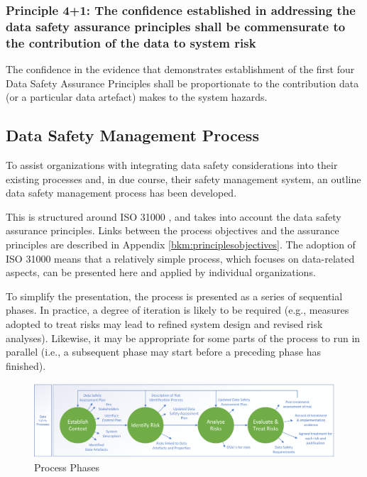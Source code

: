 \subsubsection{Principle 4+1: The confidence established in addressing the data safety assurance principles shall be commensurate to the contribution of the data to system risk}
The confidence in the evidence that demonstrates establishment of the first four Data Safety Assurance Principles shall be proportionate to the contribution data (or a particular \gls{data artefact}) makes to the system hazards.

\cbstart\subsection{Data Safety Management Process}
To assist organizations with integrating data safety considerations into their existing processes and,
in due course, their safety management system, an outline data safety management process has
been developed.

This is structured around ISO 31000 \cite{citation:iso310002018risk}, and takes into account the data safety assurance principles.
Links between the process objectives and the assurance principles are described in Appendix \ref{bkm:principlesobjectives}. The
adoption of ISO 31000 means that a relatively simple process, which focuses on data-related
aspects, can be presented here and applied by individual organizations.

To simplify the presentation, the process is presented as a series of sequential phases. In practice, a
degree of iteration is likely to be required (e.g., measures adopted to treat risks may lead to refined
system design and revised risk analyses). Likewise, it may be appropriate for some parts of the
process to run in parallel (i.e., a subsequent phase may start before a preceding phase has finished).
\begin{figure}[h]
\centering
\includegraphics[scale=0.45]{images/process diagram v3 Data Safety Only}
\caption{Process Phases}
\label{fig:process_phases}
\end{figure}

